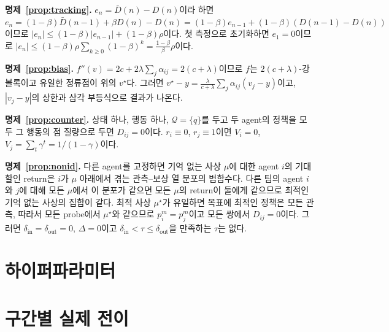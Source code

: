 \documentclass[twocolumn,10pt]{article}
\theoremstyle{remark}
\begin{document}
\textbf{명제~\ref{prop:tracking}.} $e_n=\bar D(n)-D(n)$이라 하면 $e_n=(1-\beta)\bar D(n-1)+\beta D(n)-D(n)=(1-\beta)e_{n-1}+(1-\beta)(D(n-1)-D(n))$이므로
$|e_n|\le(1-\beta)|e_{n-1}|+(1-\beta)\rho$이다. 첫 측정으로 초기화하면 $e_1=0$이므로
$|e_n|\le(1-\beta)\rho\sum_{k\ge0}(1-\beta)^k=\frac{1-\beta}{\beta}\rho$이다.

\textbf{명제~\ref{prop:bias}.} $f''(v)=2c+2\lambda\sum_j\alpha_{ij}=2(c+\lambda)$이므로 $f$는 $2(c+\lambda)$-강볼록이고 유일한 정류점이
위의 $v^\star$다. 그러면 $v^\star-y=\frac{\lambda}{c+\lambda}\sum_j\alpha_{ij}(v_j-y)$이고, $|v_j-y|$의 상한과 삼각 부등식으로 결과가
나온다.

\textbf{명제~\ref{prop:counter}.} 상태 하나, 행동 하나, $\mathcal{Q}=\{q\}$를 두고 두 agent의 정책을 모두 그 행동의 점 질량으로 두면
$D_{ij}=0$이다. $r_i\equiv0$, $r_j\equiv1$이면 $V_i=0$, $V_j=\sum_t\gamma^t=1/(1-\gamma)$이다.

\textbf{명제~\ref{prop:nonid}.} 다른 agent를 고정하면 기억 없는 사상 $\mu$에 대한 agent $i$의 기대 할인 return은 $i$가 $\mu$ 아래에서
겪는 관측--보상 열 분포의 범함수다. 다른 팀의 agent $i$와 $j$에 대해 모든 $\mu$에서 이 분포가 같으면 모든 $\mu$의 return이 둘에게
같으므로 최적인 기억 없는 사상의 집합이 같다. 최적 사상 $\mu^\star$가 유일하면 목표에 최적인 정책은 모든 관측, 따라서 모든 probe에서
$\mu^\star$와 같으므로 $p_i^m=p_j^m$이고 모든 쌍에서 $D_{ij}=0$이다. 그러면 $\delta_{\mathrm{in}}=\delta_{\mathrm{out}}=0$, $\Delta=0$이고
$\delta_{\mathrm{in}}<\tau\le\delta_{\mathrm{out}}$을 만족하는 $\tau$는 없다.

\section{하이퍼파라미터}
\label{app:hyper}
\begin{table}[h]
\centering
\small

\caption{처음부터 학습한 E1 비교의 설정(donor 집합 외에는 모든 방법이 같다). 본 과제 B는 agent 수(6), 팀당 요청(3), 통신
범위(3), 팀 보상, 목표 위치가 다르다.}
\end{table}

\section{구간별 실제 전이}
\begin{table}[h]
\centering
\small

\caption{E1의 학습 구간별 실제 전이(seed 1개). arc는 receiver--donor 방향 연결이다.}
\end{table}
\end{document}
